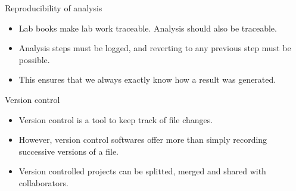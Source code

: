\begin{frame}{Reproducibility of analysis}
    
    \begin{itemize}
        
        \item Lab books make lab work traceable. Analysis should also be 
          traceable.
        
        \pause
        
        \item Analysis steps must be logged, and reverting to any previous step
          must be possible.
        
        \pause
        
        \item This ensures that we always exactly know how a result was 
          generated. 
        
    \end{itemize}
    
\end{frame}



\begin{frame}{Version control}
    
    \begin{itemize}
        
        \item Version control is a tool to keep track of file changes.
        
        \pause
        
        \item However, version control softwares offer more than simply 
          recording successive versions of a file.
          
        \pause
        
        \item Version controlled projects can be splitted, merged and shared
          with collaborators.
        
    \end{itemize}

\end{frame}



